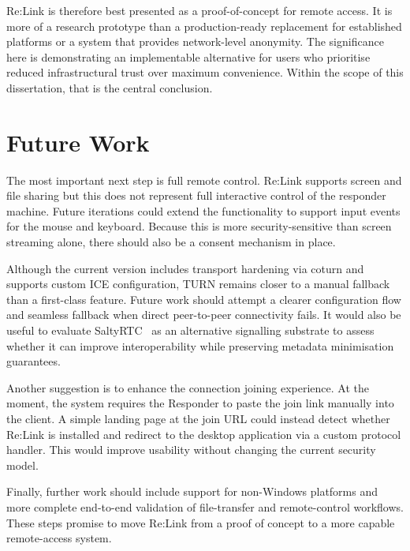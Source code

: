 \documentclass[12pt,a4paper,oneside]{report}
\begin{document}
Re:Link is therefore best presented as a proof-of-concept for remote access. It is more of a research prototype than a production-ready replacement for established platforms or a system that provides network-level anonymity. The significance here is demonstrating an implementable alternative for users who prioritise reduced infrastructural trust over maximum convenience. Within the scope of this dissertation, that is the central conclusion.


\chapter{Future Work}
\label{ch:future-work}

The most important next step is full remote control. Re:Link supports screen and file sharing but this does not represent full interactive control of the responder machine. Future iterations could extend the functionality to support input events for the mouse and keyboard. Because this is more security-sensitive than screen streaming alone, there should also be a consent mechanism in place.

Although the current version includes transport hardening via coturn and supports custom ICE configuration, TURN remains closer to a manual fallback than a first-class feature. Future work should attempt a clearer configuration flow and seamless fallback when direct peer-to-peer connectivity fails. It would also be useful to evaluate SaltyRTC~\cite{saltyrtc} as an alternative signalling substrate to assess whether it can improve interoperability while preserving metadata minimisation guarantees.

Another suggestion is to enhance the connection joining experience. At the moment, the system requires the Responder to paste the join link manually into the client. A simple landing page at the join URL could instead detect whether Re:Link is installed and redirect to the desktop application via a custom protocol handler. This would improve usability without changing the current security model.

Finally, further work should include support for non-Windows platforms and more complete end-to-end validation of file-transfer and remote-control workflows. These steps promise to move Re:Link from a proof of concept to a more capable remote-access system.


\nocite{*}


\end{document}
